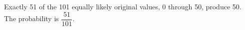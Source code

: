 Exactly 51 of the 101 equally likely original values, 0 through 50, produce 50. The probability is $\boxed{\dfrac{51}{101}}$.
